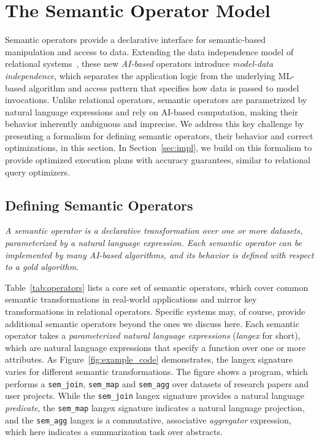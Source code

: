 \section{The Semantic Operator Model}
\label{sec:operators}

Semantic operators provide a declarative interface for semantic-based manipulation and access to data.  Extending the data independence model of relational systems~\cite{codd_relational_1970}, these new \emph{AI-based} operators introduce \emph{model-data independence}, which separates the application logic from the underlying ML-based algorithm and access pattern that specifies how data is passed to model invocations. 
Unlike relational operators, semantic operators are parametrized by natural language expressions and rely on AI-based computation, making their behavior inherently ambiguous and imprecise. We address this key challenge by presenting a formalism for defining semantic operators, their behavior and correct optimizations, in this section.
In Section~\ref{sec:impl}, we build on this formalism to provide optimized execution plans with accuracy guarantees, similar to relational query optimizers.


\subsection{Defining Semantic Operators}
 
 \emph{A semantic operator is a declarative transformation over one or more datasets, parameterized by a natural language expression. Each semantic operator can be implemented by many AI-based algorithms, and its behavior is defined with respect to a gold algorithm.}



Table~\ref{tab:operators} lists a core set of semantic operators, which cover common semantic transformations in real-world applications and mirror key transformations in relational operators.
Specific systems may, of course, provide additional semantic operators beyond the ones we discuss here. 
Each semantic operator takes a \emph{parameterized natural language expressions} (\emph{langex} for short), which are natural language expressions that specify a function over one or more attributes. As Figure~\ref{fig:example_code} demonstrates, the langex signature varies for different semantic transformations. The figure shows a \sys program, 
which performs a \verb|sem_join|, \verb|sem_map| and \verb|sem_agg| over datasets of research papers and user projects.
While the \verb|sem_join| langex signature provides a natural language \emph{predicate}, the \verb|sem_map| langex signature indicates a natural language projection, and the \verb|sem_agg| langex is a commutative, associative \emph{aggregator} expression, which here indicates a summarization task over abstracts. 

